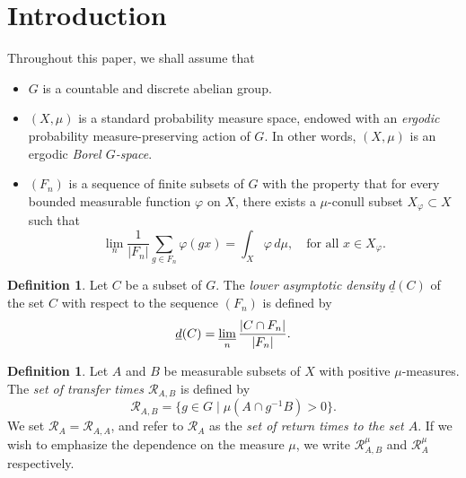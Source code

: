 \documentclass[JEP,XML,SOM,Unicode]{cedram}
\let\mathcal\mathscr
\newcommand{\cR}{\mathcal{R}}
\theoremstyle{plain}
\theoremstyle{definition}
\newtheorem{definition}[theorem]{Definition}
\begin{document}
\vspace*{-1.5\baselineskip}
\vskip0pt\enlargethispage{.5\baselineskip}%
\section{Introduction}

Throughout this paper, we shall assume that
\begin{itemize}
\item $G$ is a countable and discrete abelian group.

\item $(X,\mu)$ is a standard probability measure space, endowed with an \emph{ergodic} probability measure-preserving action of $G$.
In other words, $(X,\mu)$ is an ergodic \emph{Borel $G$-space}.

\item $(F_n)$ is a sequence of finite subsets of $G$ with the property that for every bounded measurable function $\varphi$ on $X$, there
exists a $\mu$-conull subset $X_\varphi \subset X$ such that
\begin{equation}
\label{pointwise}
\lim_n \frac{1}{|F_n|} \sum_{g \in F_n} \varphi(gx) = \int_X \varphi \, d\mu, \quad \textrm{for all $x \in X_\varphi$}.
\end{equation}
\end{itemize}

\begin{definition}
Let $C$ be a subset of $G$. The \emph{lower asymptotic density} $\underline{d}(C)$ of the set $C$ with respect to the sequence $(F_n)$ is defined by
\begin{equation}
\label{def_lad}
\underline{d}(C) = \varliminf_n \frac{|C \cap F_n|}{|F_n|}.
\end{equation}
\end{definition}

\begin{definition}
Let $A$ and $B$ be measurable subsets of $X$ with positive $\mu$-measures. The \emph{set of transfer times $\cR_{A,B}$} is defined by
\begin{equation}
\label{def_RAB}
\cR_{A,B} = \bigl\{ g \in G \mid  \mu(A \cap g^{-1}B) > 0 \bigr\}.
\end{equation}
We set $\cR_A = \cR_{A,A}$, and refer to $\cR_A$ as the \emph{set of return times to the set $A$}. If we wish to emphasize the dependence on
the measure $\mu$, we write $\cR^\mu_{A,B}$ and $\cR^{\mu}_A$ respectively.
\end{definition}
\end{document}
